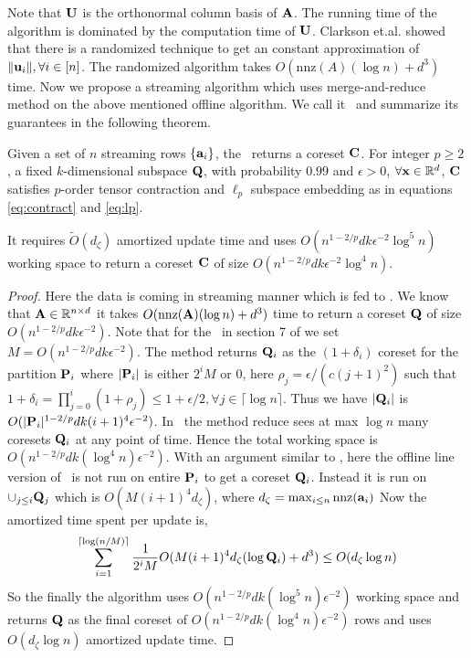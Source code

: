 Note that $\mathbf{U}$ is the orthonormal column basis of $\mathbf{A}$. The running time of the algorithm is dominated by the computation time of $\mathbf{U}$. Clarkson et.al. \cite{woodruff2014sketching, clarkson2017low} showed that there is a randomized technique to get an constant approximation of $\|\mathbf{u}_{i}\|, \forall i \in [n]$. The randomized algorithm takes $O(\mbox{nnz}(A)(\log n) + d^{3})$ time. Now we propose a streaming algorithm which uses \cite{har2004coresets} merge-and-reduce method on the above mentioned offline algorithm. We call it \mrlf~and summarize its guarantees in the following theorem.
% 
\begin{theorem}{\label{thm:stream-LF}}
 Given a set of $n$ streaming rows $\{\mathbf{a}_{i}\}$, the \mrlf~returns a coreset $\mathbf{C}$. For integer $p \geq 2$, a fixed $k$-dimensional subspace $\mathbf{Q}$, with probability $0.99$ and $\epsilon > 0$, $\forall \mathbf{x}\in \mathbb{R}^{d}$, $\mathbf{C}$ satisfies $p$-order tensor contraction and $\ell_{p}$ subspace embedding as in equations \eqref{eq:contract} and \eqref{eq:lp}.

 It requires $\tilde{O}(d_{\zeta})$ amortized update time and uses $O(n^{1-2/p}dk\epsilon^{-2}\log^{5} n)$ working space to return a coreset $\mathbf{C}$ of size $O(n^{1-2/p}dk\epsilon^{-2}\log^{4} n)$.
\end{theorem}
% 
\begin{proof}\label{proof:stream-LF}
 Here the data is coming in streaming manner which is fed to \mrlf. We know that $\mathbf{A} \in \mathbb{R}^{n \times d}$ it takes $O(\mbox{nnz}(\mathbf{A})(\log n) + d^{3})$ time to return a coreset $\mathbf{Q}$ of size $O(n^{1-2/p}dk\epsilon^{-2})$. Note that for the \mrlf~in section 7 of \cite{har2004coresets} we set $M=O(n^{1-2/p}dk\epsilon^{-2})$. The method returns $\mathbf{Q}_{i}$ as the $(1 + \delta_{i})$ coreset for the partition $\mathbf{P}_{i}$ where $|\mathbf{P}_{i}|$ is either $2^{i}M$ or $0$, here $\rho_{j} = \epsilon/(c(j+1)^{2})$ such that $1+\delta_{i} = \prod_{j=0}^{i} (1 + \rho_{j}) \leq 1 + \epsilon/2, \forall j \in \lceil \log n \rceil$. Thus we have $|\mathbf{Q}_{i}|$ is $O(|\mathbf{P}_{i}|^{1-2/p}dk(i+1)^{4}\epsilon^{-2})$. In \mrlf~the method reduce sees at max $\log n$ many coresets $\mathbf{Q}_{i}$ at any point of time. Hence the total working space is $O(n^{1-2/p}dk(\log^{4} n)\epsilon^{-2})$. With an argument similar to \mrlw, here the offline line version of \online~is not run on entire $\mathbf{P}_{i}$ to get a coreset $\mathbf{Q}_{i}$. Instead it is run on $\cup_{j \leq i} \mathbf{Q}_{j}$ which is $O(M(i+1)^{4}d_{\zeta})$, where $d_{\zeta} = \max_{i \leq n} \mbox{nnz}(\mathbf{a}_{i})$
 Now the amortized time spent per update is,
 \begin{eqnarray*}
  \sum_{i=1}^{\lceil \log (n/M) \rceil} \frac{1}{2^{i}M}O(M(i+1)^{4}d_{\zeta}(\log \mathbf{Q}_{i}) + d^{3}) \leq O(d_{\zeta}\log n)
 \end{eqnarray*}
So the finally the algorithm uses $O(n^{1-2/p}dk(\log^{5} n)\epsilon^{-2})$ working space and returns $\mathbf{Q}$ as the final coreset of $O(n^{1-2/p}dk(\log^{4} n)\epsilon^{-2})$ rows and uses $O(d_{\zeta}\log n)$ amortized update time.
\end{proof}
